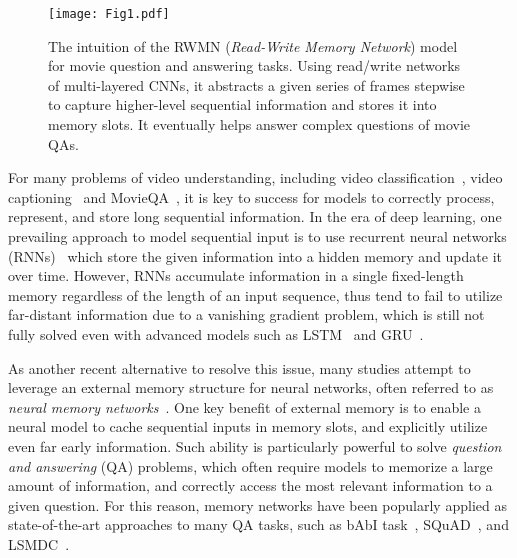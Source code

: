 \documentclass[10pt,twocolumn,letterpaper]{article}
\theoremstyle{nonumberplain}
\begin{document}
\begin{figure}[t]
\centering
\texttt{[image: Fig1.pdf]}
\caption{The intuition of the RWMN (\textit{Read-Write Memory Network}) model for movie question and answering tasks. 
Using read/write networks of multi-layered CNNs, it abstracts a given series of frames stepwise to capture higher-level sequential information and stores it into memory slots. It eventually helps answer complex questions of movie QAs.
}
\label{fig:overview}
\end{figure}
For many problems of video understanding, including video classification~\cite{abu2016youtube,karpathy2014l}, video captioning~\cite{xu2016msr,yu2017lsmdc} and MovieQA~\cite{tapaswi2016movieqa}, it is key to success for models to correctly process, represent, and store long sequential information. 
In the era of deep learning, one prevailing approach to model sequential input is to use recurrent neural networks  (RNNs)~\cite{mikolov2010recurrent} which store the given information into a hidden memory and update it over time. However, RNNs accumulate information in a single fixed-length memory regardless of the length of an input sequence, thus tend to fail to utilize far-distant information due to a vanishing gradient problem, which is still not fully solved even with advanced models such as LSTM~\cite{hochreiter1997long} and GRU~\cite{cho2014learning}. 


As another recent alternative to resolve this issue, many studies attempt to  leverage an external memory structure for neural networks, often referred to as \textit{neural memory networks}~\cite{graves2014neural,graves2016hybrid,gulcehre2016dynamic,kumar2015ask,sukhbaatar2015end,weston2014memory}.
One key benefit of external memory is to enable a neural model to cache sequential inputs in memory slots, and explicitly utilize even far early information. 
Such ability is particularly powerful to solve \textit{question and answering} (QA) problems, which often require models to memorize a large amount of information, and correctly access the most relevant information to a given question. 
For this reason, memory networks have been popularly applied as state-of-the-art approaches to many QA tasks, such as bAbI task~\cite{weston2015towards}, SQuAD~\cite{rajpurkar2016squad}, and LSMDC~\cite{rohrbach2016movie}.
\end{document}
